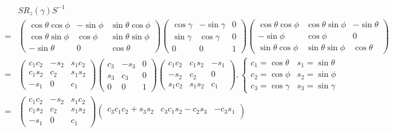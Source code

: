 \documentclass[
]{book}
\theoremstyle{definition}
\theoremstyle{definition}
\theoremstyle{definition}
\theoremstyle{definition}
\theoremstyle{remark}
\begin{document}
\[
\begin{aligned}
 & SR_{{\scriptscriptstyle z}}\left(\gamma\right)S^{-1}\\
= & \begin{pmatrix}\cos\theta\cos\phi & -\sin\phi & \sin\theta\cos\phi\\
\cos\theta\sin\phi & \cos\phi & \sin\theta\sin\phi\\
-\sin\theta & 0 & \cos\theta
\end{pmatrix}\begin{pmatrix}\cos\gamma & -\sin\gamma & 0\\
\sin\gamma & \cos\gamma & 0\\
0 & 0 & 1
\end{pmatrix}\begin{pmatrix}\cos\theta\cos\phi & \cos\theta\sin\phi & -\sin\theta\\
-\sin\phi & \cos\phi & 0\\
\sin\theta\cos\phi & \sin\theta\sin\phi & \cos\theta
\end{pmatrix}\\
= & \begin{pmatrix}c_{1}c_{2} & -s_{2} & s_{1}c_{2}\\
c_{1}s_{2} & c_{2} & s_{1}s_{2}\\
-s_{1} & 0 & c_{1}
\end{pmatrix}\begin{pmatrix}c_{3} & -s_{3} & 0\\
s_{3} & c_{3} & 0\\
0 & 0 & 1
\end{pmatrix}\begin{pmatrix}c_{1}c_{2} & c_{1}s_{2} & -s_{1}\\
-s_{2} & c_{2} & 0\\
s_{1}c_{2} & s_{1}s_{2} & c_{1}
\end{pmatrix},\begin{cases}
c_{1}=\cos\theta & s_{1}=\sin\theta\\
c_{2}=\cos\phi & s_{2}=\sin\phi\\
c_{3}=\cos\gamma & s_{3}=\sin\gamma
\end{cases}\\
= & \begin{pmatrix}c_{1}c_{2} & -s_{2} & s_{1}c_{2}\\
c_{1}s_{2} & c_{2} & s_{1}s_{2}\\
-s_{1} & 0 & c_{1}
\end{pmatrix}\begin{pmatrix}c_{3}c_{1}c_{2}+s_{3}s_{2} & c_{3}c_{1}s_{2}-c_{2}s_{3} & -c_{3}s_{1}\\

\end{pmatrix}
\end{aligned}\]
\end{document}
